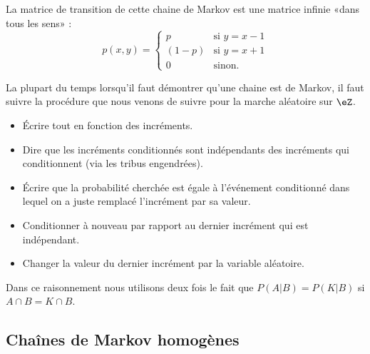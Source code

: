 La matrice de transition de cette chaine de Markov est une matrice infinie «dans tous les sens» :
\begin{equation}
	p(x,y)=\begin{cases}
		p     & \text{si }y=x-1 \\
		(1-p) & \text{si }y=x+1 \\
		0     & \text{sinon}.
	\end{cases}
\end{equation}

\begin{remark}
	La plupart du temps lorsqu'il faut démontrer qu'une chaine est de Markov, il faut suivre la procédure que nous venons de suivre pour la marche aléatoire sur \( \eZ\).
	\begin{itemize}
		\item Écrire tout en fonction des incréments.
		\item Dire que les incréments conditionnés sont indépendants des incréments qui conditionnent (via les tribus engendrées).
		\item Écrire que la probabilité cherchée est égale à l'événement conditionné dans lequel on a juste remplacé l'incrément par sa valeur.
		\item Conditionner à nouveau par rapport au dernier incrément qui est indépendant.
		\item Changer la valeur du dernier incrément par la variable aléatoire.
	\end{itemize}
	Dans ce raisonnement nous utilisons deux fois le fait que \( P(A|B)=P(K|B)\) si \( A\cap B=K\cap B\).
\end{remark}

\subsection{Chaînes de Markov homogènes}

